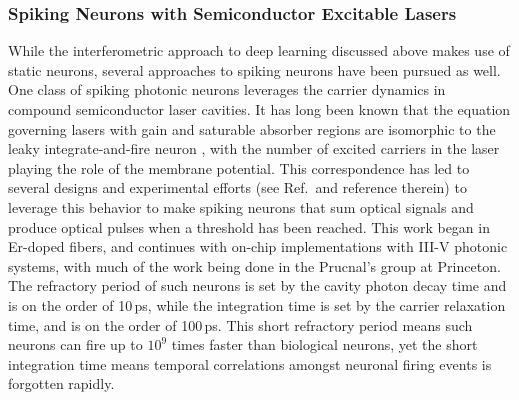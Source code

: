 \cite{laso2012,apso2011,orso2015,brfi2015,brso2013,bubr2017,buma2018,brpe2018}

\cite{rofi2017}

\subsubsection{Spiking Neurons with Semiconductor Excitable Lasers}
While the interferometric approach to deep learning discussed above makes use of static neurons, several approaches to spiking neurons have been pursued as well. One class of spiking photonic neurons leverages the carrier dynamics in compound semiconductor laser cavities. It has long been known that the equation governing lasers with gain and saturable absorber regions are isomorphic to the leaky integrate-and-fire neuron \cite{dukr1999}, with the number of excited carriers in the laser playing the role of the membrane potential. This correspondence has led to several designs \cite{nata2013} and experimental efforts (see Ref.\,\cite{prsh2017} and reference therein) to leverage this behavior to make spiking neurons that sum optical signals and produce optical pulses when a threshold has been reached. This work began in Er-doped fibers, and continues with on-chip implementations with III-V photonic systems, with much of the work being done in the Prucnal's group at Princeton. The refractory period of such neurons is set by the cavity photon decay time and is on the order of 10\,ps, while the integration time is set by the carrier relaxation time, and is on the order of 100\,ps. This short refractory period means such neurons can fire up to $10^9$ times faster than biological neurons, yet the short integration time means temporal correlations amongst neuronal firing events is forgotten rapidly. 

